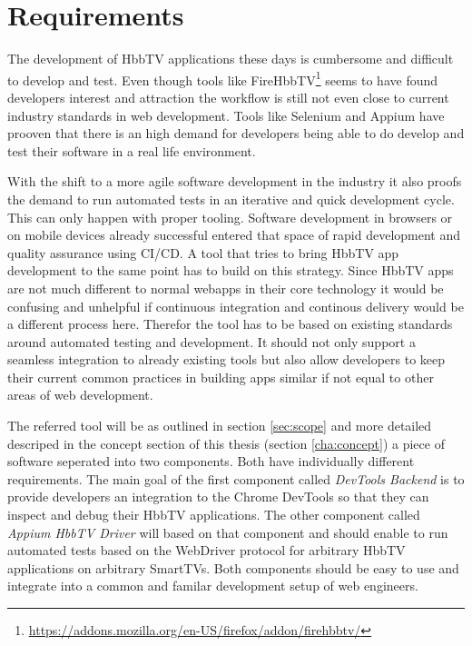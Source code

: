\chapter{Requirements\label{cha:chapter3}}

The development of HbbTV applications these days is cumbersome and difficult to develop and test.
Even though tools like FireHbbTV\footnote{\url{https://addons.mozilla.org/en-US/firefox/addon/firehbbtv/}}
seems to have found developers interest and attraction the workflow is still not even close to
current industry standards in web development. Tools like Selenium and Appium have prooven that
there is an high demand for developers being able to do develop and test their software in a real
life environment.

With the shift to a more agile software development in the industry it also proofs the demand
to run automated tests in an iterative and quick development cycle. This can only happen
with proper tooling. Software development in browsers or on mobile devices already successful
entered that space of rapid development and quality assurance using CI/CD. A tool that
tries to bring HbbTV app development to the same point has to build on this strategy. Since
HbbTV apps are not much different to normal webapps in their core technology it would be confusing
and unhelpful if continuous integration and continous delivery would be a different process here.
Therefor the tool has to be based on existing standards around automated testing and development.
It should not only support a seamless integration to already existing tools but also allow
developers to keep their current common practices in building apps similar if not equal to other
areas of web development.

The referred tool will be as outlined in section \ref{sec:scope} and more detailed descriped in
the concept section of this thesis (section \ref{cha:concept}) a piece of software seperated
into two components. Both have individually different requirements. The main goal of the first
component called \textit{DevTools Backend} is to provide developers an integration to the
Chrome DevTools so that they can inspect and debug their HbbTV applications. The other
component called \textit{Appium HbbTV Driver} will based on that component and should enable
to run automated tests based on the WebDriver protocol for arbitrary HbbTV applications on
arbitrary SmartTVs. Both components should be easy to use and integrate into a common and
familar development setup of web engineers.

